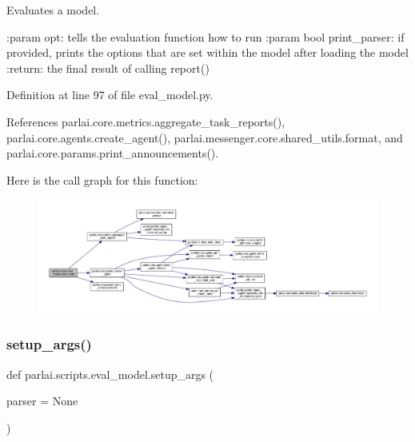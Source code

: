 \begin{DoxyVerb}Evaluates a model.

:param opt: tells the evaluation function how to run
:param bool print_parser: if provided, prints the options that are set within the
    model after loading the model
:return: the final result of calling report()
\end{DoxyVerb}
 

Definition at line 97 of file eval\+\_\+model.\+py.



References parlai.\+core.\+metrics.\+aggregate\+\_\+task\+\_\+reports(), parlai.\+core.\+agents.\+create\+\_\+agent(), parlai.\+messenger.\+core.\+shared\+\_\+utils.\+format, and parlai.\+core.\+params.\+print\+\_\+announcements().

Here is the call graph for this function\+:
\nopagebreak
\begin{figure}[H]
\begin{center}
\leavevmode
\includegraphics[width=350pt]{namespaceparlai_1_1scripts_1_1eval__model_ade1dfda1be70776553a1fbd6a3450c40_cgraph}
\end{center}
\end{figure}
\mbox{\label{namespaceparlai_1_1scripts_1_1eval__model_a2eaba0aa76c4d83e2a0f7f77c23479c8}} 
\subsubsection{\texorpdfstring{setup\+\_\+args()}{setup\_args()}}
{\footnotesize\ttfamily def parlai.\+scripts.\+eval\+\_\+model.\+setup\+\_\+args (\begin{DoxyParamCaption}\item[{}]{parser = {\ttfamily None} }\end{DoxyParamCaption})}




